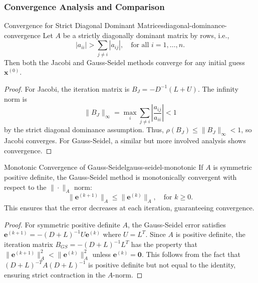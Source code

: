 \subsubsection{Convergence Analysis and Comparison}

\begin{theorem}{Convergence for Strict Diagonal Dominant Matrices}{diagonal-dominance-convergence}
    Let $A$ be a strictly diagonally dominant matrix by rows, i.e.,
    \begin{equation}
        |a_{ii}| > \sum_{j \neq i} |a_{ij}|, \quad \text{for all } i = 1, \ldots, n.
    \end{equation}
    Then both the Jacobi and Gauss-Seidel methods converge for any initial guess $\mathbf{x}^{(0)}$.
\end{theorem}

\begin{proof}
    For Jacobi, the iteration matrix is $B_J = -D^{-1}(L+U)$. The infinity norm is
    \begin{equation}
        \|B_J\|_\infty = \max_{i} \sum_{j \neq i} \left|\frac{a_{ij}}{a_{ii}}\right| < 1
    \end{equation}
    by the strict diagonal dominance assumption. Thus, $\rho(B_J) \leq \|B_J\|_\infty < 1$, so Jacobi converges.
    For Gauss-Seidel, a similar but more involved analysis shows convergence.
\end{proof}

\begin{theorem}{Monotonic Convergence of Gauss-Seidel}{gauss-seidel-monotonic}
    If $A$ is symmetric positive definite, the Gauss-Seidel method is monotonically convergent with respect to the $\|\cdot\|_A$ norm:
    \begin{equation}
        \|\mathbf{e}^{(k+1)}\|_A \leq \|\mathbf{e}^{(k)}\|_A, \quad \text{for } k \geq 0.
    \end{equation}
    This ensures that the error decreases at each iteration, guaranteeing convergence.
\end{theorem}

\begin{proof}
    For symmetric positive definite $A$, the Gauss-Seidel error satisfies $\mathbf{e}^{(k+1)} = -(D + L)^{-1}U \mathbf{e}^{(k)}$ where $U = L^T$. Since $A$ is positive definite, the iteration matrix $B_{GS} = -(D + L)^{-1}L^T$ has the property that $\|\mathbf{e}^{(k+1)}\|_A^2 < \|\mathbf{e}^{(k)}\|_A^2$ unless $\mathbf{e}^{(k)} = \mathbf{0}$. This follows from the fact that $(D + L)^{-T} A (D + L)^{-1}$ is positive definite but not equal to the identity, ensuring strict contraction in the $A$-norm.
\end{proof}

